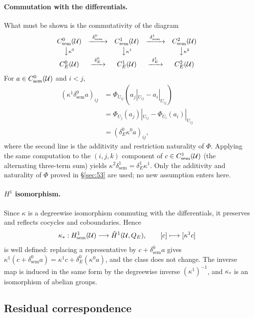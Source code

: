 \paragraph{Commutation with the differentials.}
What must be shown is the commutativity of the diagram
\[
\begin{array}{ccccc}
C^0_{\mathrm{sem}}(\mathcal U)
&\xrightarrow{\ \delta^0_{\mathrm{sem}}\ }&
C^1_{\mathrm{sem}}(\mathcal U)
&\xrightarrow{\ \delta^1_{\mathrm{sem}}\ }&
C^2_{\mathrm{sem}}(\mathcal U)\\[2pt]
\big\downarrow{\scriptstyle\kappa^0}&&\big\downarrow{\scriptstyle\kappa^1}&&\big\downarrow{\scriptstyle\kappa^2}\\[2pt]
C^0_E(\mathcal U)
&\xrightarrow{\ \delta^0_E\ }&
C^1_E(\mathcal U)
&\xrightarrow{\ \delta^1_E\ }&
C^2_E(\mathcal U)
\end{array}
\]
For $a\in C^0_{\mathrm{sem}}(\mathcal{U})$ and $i<j$,
\[
\begin{aligned}
(\kappa^1\delta^0_{\mathrm{sem}}a)_{ij}
&=\Phi_{U_{ij}}(a_j|_{U_{ij}}-a_i|_{U_{ij}})\\
&=\Phi_{U_j}(a_j)|_{U_{ij}}-\Phi_{U_i}(a_i)|_{U_{ij}}\\
&=(\delta_E^0\kappa^0a)_{ij},
\end{aligned}
\]
where the second line is the additivity and restriction naturality of
$\Phi$. Applying the same computation to the $(i,j,k)$ component of
$c\in C^1_{\mathrm{sem}}(\mathcal{U})$ (the alternating three-term sum) yields
$\kappa^2\delta^1_{\mathrm{sem}}=\delta^1_E\kappa^1$. Only the
additivity and naturality of $\Phi$ proved in \S\ref{sec:53} are used;
no new assumption enters here.

\paragraph{$H^1$ isomorphism.}
Since $\kappa$ is a degreewise isomorphism commuting with the
differentials, it preserves and reflects cocycles and coboundaries.
Hence
\[
\kappa_*:
H^1_{\mathrm{sem}}(\mathcal U)
\longrightarrow
\check H^1(\mathcal U,Q_{E}),
\qquad
[c]\longmapsto[\kappa^1c]
\]
is well defined: replacing a representative by
$c+\delta^0_{\mathrm{sem}}a$ gives
$\kappa^1(c+\delta^0_{\mathrm{sem}}a)=\kappa^1c+\delta^0_E(\kappa^0a)$, and the class
does not change. The inverse map is induced in the same form by the
degreewise inverse $(\kappa^1)^{-1}$, and $\kappa_*$ is an isomorphism
of abelian groups.

\subsection{Residual correspondence}\label{sec:55}

